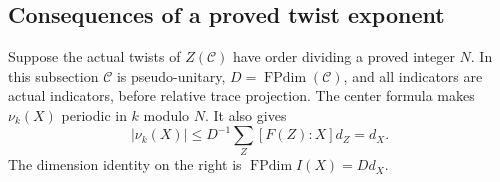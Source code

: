 \subsection{Consequences of a proved twist exponent}
\label{subsec:actual-exponent}

Suppose the actual twists of $Z(\mathcal C)$ have order dividing a
proved integer $N$. In this subsection $\mathcal C$ is pseudo-unitary,
$D=\operatorname{FPdim}(\mathcal C)$, and all indicators are actual
indicators, before relative trace projection. The center formula makes
$\nu_k(X)$ periodic in $k$ modulo $N$. It also gives
\begin{equation}\label{eq:actual-indicator-bound}
 |\nu_k(X)|\le D^{-1}\sum_Z[F(Z):X]d_Z=d_X.
\end{equation}
The dimension identity on the right is
$\operatorname{FPdim}I(X)=Dd_X$.

